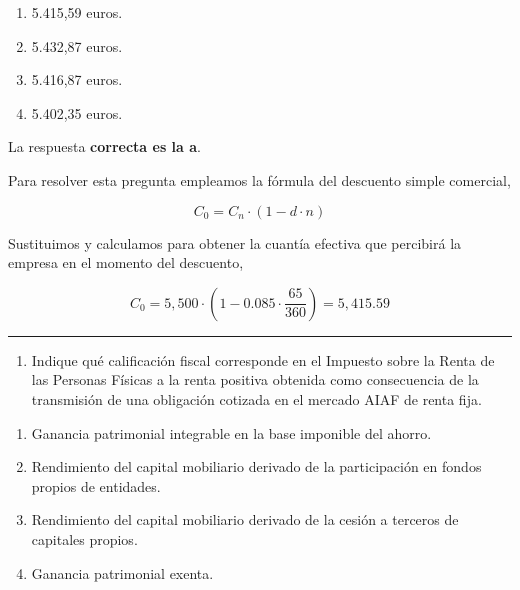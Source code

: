 \documentclass[
  letterpaper,
  DIV=11,
  numbers=noendperiod]{scrreprt}
\providecommand{\tightlist}{%
  \setlength{\itemsep}{0pt}\setlength{\parskip}{0pt}}\usepackage{longtable,booktabs,array}
\begin{document}
\begin{enumerate}
\def\labelenumi{\alph{enumi})}
\item
  5.415,59 euros.
\item
  5.432,87 euros.
\item
  5.416,87 euros.
\item
  5.402,35 euros.
\end{enumerate}

\begin{tcolorbox}[enhanced jigsaw, left=2mm, opacityback=0, colback=white, breakable, arc=.35mm, bottomrule=.15mm, rightrule=.15mm, toprule=.15mm, leftrule=.75mm, colframe=quarto-callout-tip-color-frame]
\begin{minipage}[t]{5.5mm}
\textcolor{quarto-callout-tip-color}{\faLightbulb}
\end{minipage}%
\begin{minipage}[t]{\textwidth - 5.5mm}

La respuesta \textbf{correcta es la a}.

Para resolver esta pregunta empleamos la fórmula del descuento simple
comercial,

\[{ C }_{ 0 }=C_{ n }\cdot { (1-d\cdot n) }\]

Sustituimos y calculamos para obtener la cuantía efectiva que percibirá
la empresa en el momento del descuento,

\[{ C }_{ 0 }=5,500\cdot { (1-0.085\cdot \frac { 65 }{ 360 } ) }=5,415.59\]

\end{minipage}%
\end{tcolorbox}

\begin{center}\rule{0.5\linewidth}{0.5pt}\end{center}

\begin{enumerate}
\def\labelenumi{\arabic{enumi}.}
\setcounter{enumi}{92}
\tightlist
\item
  Indique qué calificación fiscal corresponde en el Impuesto sobre la
  Renta de las Personas Físicas a la renta positiva obtenida como
  consecuencia de la transmisión de una obligación cotizada en el
  mercado AIAF de renta fija.
\end{enumerate}

\begin{enumerate}
\def\labelenumi{\alph{enumi})}
\item
  Ganancia patrimonial integrable en la base imponible del ahorro.
\item
  Rendimiento del capital mobiliario derivado de la participación en
  fondos propios de entidades.
\item
  Rendimiento del capital mobiliario derivado de la cesión a terceros de
  capitales propios.
\item
  Ganancia patrimonial exenta.
\end{enumerate}
\end{document}
